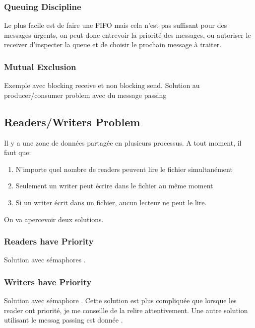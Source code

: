 \subsubsection{Queuing Discipline}
Le plus facile est de faire une FIFO mais cela n'est pas suffisant pour des messages urgents,
on peut donc entrevoir la priorité des messages,
ou autoriser le receiver d'inspecter la queue et de choisir le prochain message à traiter.

\subsubsection{Mutual Exclusion}
Exemple avec blocking receive et non blocking send.
\cite[p.~257]{stallings}
Solution au producer/consumer problem avec du message passing \cite[p.~258]{stallings}

\subsection{Readers/Writers Problem}
Il y a une zone de données partagée en plusieurs processus.
A tout moment, il faut que:
\begin{enumerate}
  \item N'importe quel nombre de readers peuvent lire le fichier simultanément
  \item Seulement un writer peut écrire dans le fichier au même moment
  \item Si un writer écrit dans un fichier, aucun lecteur ne peut le lire.
\end{enumerate}
On va apercevoir deux solutions.

\subsubsection{Readers have Priority}
Solution avec sémaphores \cite[p.~260]{stallings}.

\subsubsection{Writers have Priority}
Solution avec sémaphore \cite[p.~261]{stallings}.
Cette solution est plus compliquée que lorsque les reader ont priorité, je me conseille de la relire attentivement.
Une autre solution utilisant le messag passing est donnée \cite[p.~263]{stallings}.

\newpage


